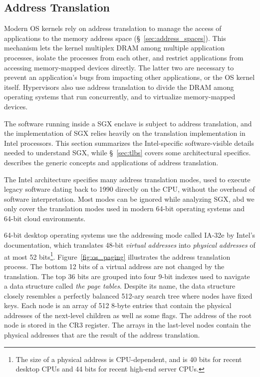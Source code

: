 \subsection{Address Translation}
\label{sec:paging}

Modern OS kernels rely on address translation to manage the access of
applications to the memory address space (\S~\ref{sec:address_spaces}). This
mechanism lets the kernel multiplex DRAM among multiple application processes,
isolate the processes from each other, and restrict applications from accessing
memory-mapped devices directly. The latter two are necessary to prevent an
application's bugs from impacting other applications, or the OS kernel itself.
Hypervisors also use address translation to divide the DRAM among operating
systems that run concurrently, and to virtualize memory-mapped devices.

The software running inside a SGX enclave is subject to address
translation, and the implementation of SGX relies heavily on the translation
implementation in Intel processors. This section summarizes the Intel-specific
software-visible details needed to understand SGX, while \S~\ref{sec:tlbs}
covers some architectural specifics. \cite{jacob1998virtual} describes the
generic concepts and applications of address translation.

The Intel architecture specifies many address translation modes, used to
execute legacy software dating back to 1990 directly on the CPU, without the
overhead of software interpretation. Most modes can be ignored while analyzing
SGX, abd we only cover the translation modes used in modern 64-bit operating
systems and 64-bit cloud environments.


64-bit desktop operating systems use the addressing mode called IA-32e by
Intel's documentation, which translates 48-bit \textit{virtual addresses} into
\textit{physical addresses} of at most 52 bits\footnote{The size of a physical
  address is CPU-dependent, and is 40 bits for recent desktop CPUs and 44 bits
for recent high-end server CPUs.}.  Figure~\ref{fig:os_paging} illustrates the
address translation process. The bottom 12 bits of a virtual address are not
changed by the translation. The top 36 bits are grouped into four 9-bit indexes
used to navigate a data structure called \textit{the page tables}. Despite its
name, the data structure closely resembles a perfectly balanced 512-ary search
tree where nodes have fixed keys.  Each node is an array of 512 8-byte entries
that contain the physical addresses of the next-level children as well as some
flags. The address of the root node is stored in the CR3 register. The arrays
in the last-level nodes contain the physical addresses that are the result of
the address translation.

